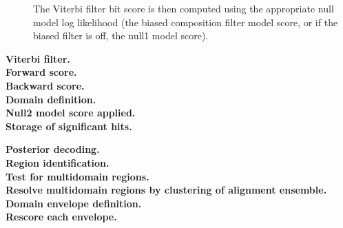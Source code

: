 \begin{description}
 The Viterbi filter bit score is then computed using the appropriate
 null model log likelihood (the biased composition filter model score,
 or if the biased filter is off, the null1 model score).

 
 
 
 







 


 
 


  

\item[\textbf{Viterbi filter.}]

\item[\textbf{Forward score.}]

\item[\textbf{Backward score.}]

\item[\textbf{Domain definition.}]

\item[\textbf{Null2 model score applied.}]

\item[\textbf{Storage of significant hits.}]
\end{description}



\begin{description}
\item[\textbf{Posterior decoding.}]

\item[\textbf{Region identification.}]

\item[\textbf{Test for multidomain regions.}]

\item[\textbf{Resolve multidomain regions by clustering of alignment ensemble.}]

\item[\textbf{Domain envelope definition.}]

\item[\textbf{Rescore each envelope.}]
\end{description}



